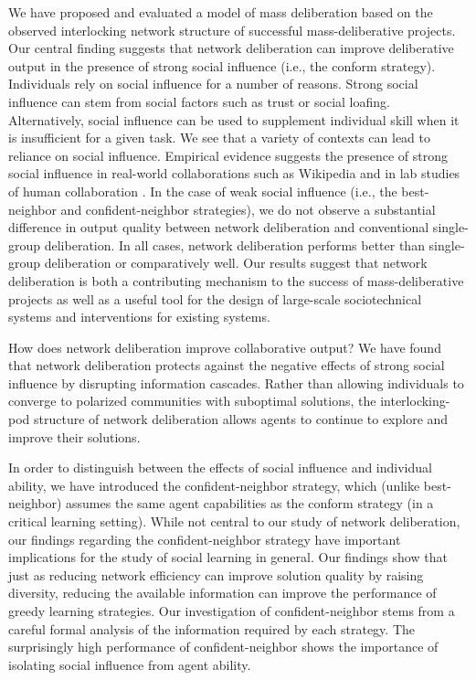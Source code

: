 We have proposed and evaluated a model of mass deliberation based on the observed interlocking network structure of successful mass-deliberative projects.
Our central finding suggests that network deliberation can improve deliberative output in the presence of strong social influence (i.e., the conform strategy).
Individuals rely on social influence for a number of reasons.
Strong social influence can stem from social factors such as trust or social loafing.
Alternatively, social influence can be used to supplement individual skill when it is insufficient for a given task.
We see that a variety of contexts can lead to reliance on social influence.
Empirical evidence suggests the presence of strong social influence in real-world collaborations such as Wikipedia \cite{platt_network_2018} and in lab studies of human collaboration \cite{mason_collaborative_2012, barkoczi_social_2016}.
In the case of weak social influence (i.e., the  best-neighbor and confident-neighbor strategies), we do not observe a substantial difference in output quality between network deliberation and conventional single-group deliberation. In all cases, network deliberation performs better than single-group deliberation or comparatively well. 
Our results suggest that network deliberation is both a contributing mechanism to the success of mass-deliberative projects as well as a useful tool for the design of large-scale sociotechnical systems and interventions for existing systems.

How does network deliberation improve collaborative output?
We have found that network deliberation protects against the negative effects of strong social influence by disrupting information cascades.
Rather than allowing individuals to converge to polarized communities with suboptimal solutions, the interlocking-pod structure of network deliberation allows agents to continue to explore and improve their solutions.

In order to distinguish between the effects of social influence and individual ability, we have introduced the confident-neighbor strategy, which (unlike best-neighbor) assumes the same agent capabilities as the conform strategy (in a critical learning setting).
While not central to our study of network deliberation, our findings regarding the 
confident-neighbor strategy have important implications for the study of social learning in general. 
Our findings show that just as reducing network efficiency can improve solution quality by raising diversity, reducing the available information can improve the performance of greedy learning strategies. Our investigation of confident-neighbor stems from a careful formal analysis of the information required by each strategy. The surprisingly high performance of confident-neighbor shows the importance of isolating social influence from agent ability.

